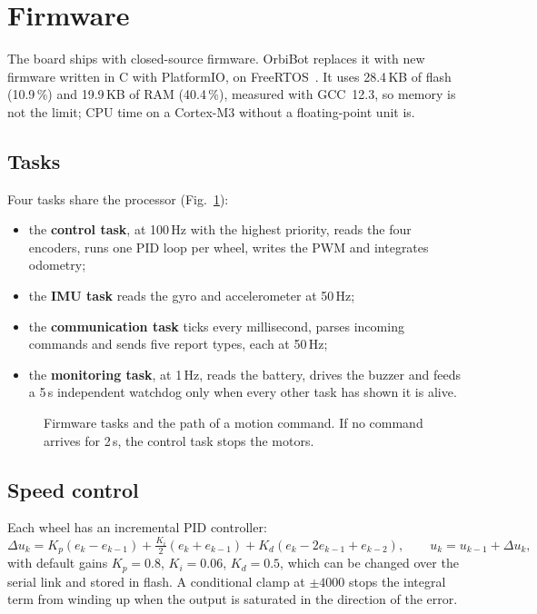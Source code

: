 \documentclass[11pt]{article}
\begin{document}
\section{Firmware}
\label{sec:firmware}

The board ships with closed-source firmware. OrbiBot replaces it with new firmware written in C with PlatformIO, on FreeRTOS~\cite{freertos}. It uses 28.4\,KB of flash (10.9\,\%) and 19.9\,KB of RAM (40.4\,\%), measured with GCC~12.3, so memory is not the limit; CPU time on a Cortex-M3 without a floating-point unit is.

\subsection{Tasks}

Four tasks share the processor (Fig.~\ref{fig:tasks}):

\begin{itemize}
  \item the \textbf{control task}, at 100\,Hz with the highest priority, reads the four encoders, runs one PID loop per wheel, writes the PWM and integrates odometry;
  \item the \textbf{IMU task} reads the gyro and accelerometer at 50\,Hz;
  \item the \textbf{communication task} ticks every millisecond, parses incoming commands and sends five report types, each at 50\,Hz;
  \item the \textbf{monitoring task}, at 1\,Hz, reads the battery, drives the buzzer and feeds a 5\,s independent watchdog only when every other task has shown it is alive.
\end{itemize}

\begin{figure}[htbp]
  \centering
  \caption{Firmware tasks and the path of a motion command. If no command arrives for 2\,s, the control task stops the motors.}
  \label{fig:tasks}
\end{figure}

\subsection{Speed control}

Each wheel has an incremental PID controller:
\begin{equation}
\Delta u_k = K_p (e_k - e_{k-1}) + \tfrac{K_i}{2}(e_k + e_{k-1}) + K_d (e_k - 2e_{k-1} + e_{k-2}), \qquad u_k = u_{k-1} + \Delta u_k ,
\end{equation}
with default gains $K_p = 0.8$, $K_i = 0.06$, $K_d = 0.5$, which can be changed over the serial link and stored in flash. A conditional clamp at $\pm 4000$ stops the integral term from winding up when the output is saturated in the direction of the error.
\end{document}
